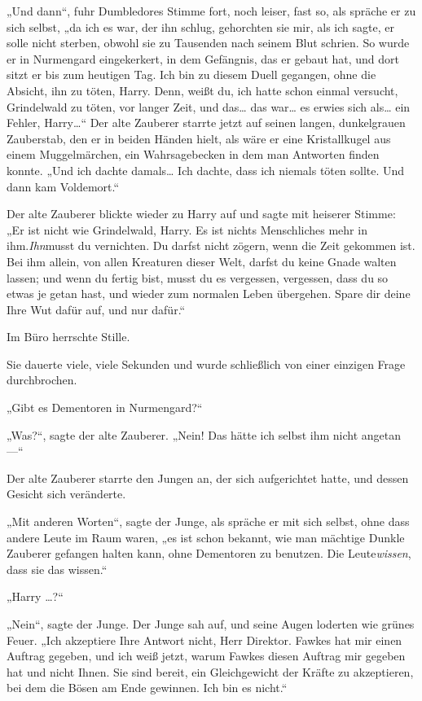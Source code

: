 {„Und dann“, fuhr Dumbledores Stimme fort, noch leiser, fast so, als spräche er zu sich selbst, „da ich es war, der ihn schlug, gehorchten sie mir, als ich sagte, er solle nicht sterben, obwohl sie zu Tausenden nach seinem Blut schrien. So wurde er in Nurmengard eingekerkert, in dem Gefängnis, das er gebaut hat, und dort sitzt er bis zum heutigen Tag. Ich bin zu diesem Duell gegangen, ohne die Absicht, ihn zu töten, Harry. Denn, weißt du, ich hatte schon einmal versucht, Grindelwald zu töten, vor langer Zeit, und das… das war… es erwies sich als… ein Fehler, Harry…“ Der alte Zauberer starrte jetzt auf seinen langen, dunkelgrauen Zauberstab, den er in beiden Händen hielt, als wäre er eine Kristallkugel aus einem Muggelmärchen, ein Wahrsagebecken in dem man Antworten finden konnte. „Und ich dachte damals… Ich dachte, dass ich niemals töten sollte. Und dann kam Voldemort.“

Der alte Zauberer blickte wieder zu Harry auf und sagte mit heiserer Stimme: „Er ist nicht wie Grindelwald, Harry. Es ist nichts Menschliches mehr in ihm.\emph{Ihn}musst du vernichten. Du darfst nicht zögern, wenn die Zeit gekommen ist. Bei ihm allein, von allen Kreaturen dieser Welt, darfst du keine Gnade walten lassen; und wenn du fertig bist, musst du es vergessen, vergessen, dass du so etwas je getan hast, und wieder zum normalen Leben übergehen. Spare dir deine Ihre Wut dafür auf, und nur dafür.“

Im Büro herrschte Stille.

Sie dauerte viele, viele Sekunden und wurde schließlich von einer einzigen Frage durchbrochen.

„Gibt es Dementoren in Nurmengard?“

„Was?“, sagte der alte Zauberer. „Nein! Das hätte ich selbst ihm nicht angetan—“

Der alte Zauberer starrte den Jungen an, der sich aufgerichtet hatte, und dessen Gesicht sich veränderte.

„Mit anderen Worten“, sagte der Junge, als spräche er mit sich selbst, ohne dass andere Leute im Raum waren, „es ist schon bekannt, wie man mächtige Dunkle Zauberer gefangen halten kann, ohne Dementoren zu benutzen. Die Leute\emph{wissen}, dass sie das wissen.“

„Harry …?“

„Nein“, sagte der Junge. Der Junge sah auf, und seine Augen loderten wie grünes Feuer. „Ich akzeptiere Ihre Antwort nicht, Herr Direktor. Fawkes hat mir einen Auftrag gegeben, und ich weiß jetzt, warum Fawkes diesen Auftrag mir gegeben hat und nicht Ihnen. Sie sind bereit, ein Gleichgewicht der Kräfte zu akzeptieren, bei dem die Bösen am Ende gewinnen. Ich bin es nicht.“

}
